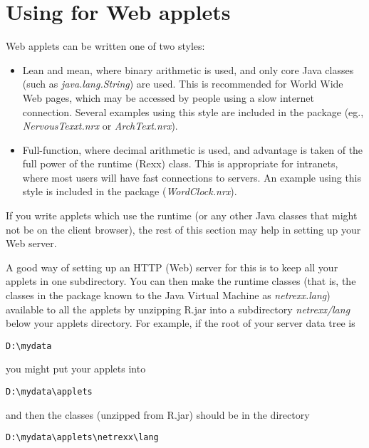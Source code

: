 \chapter{Using \nr{} for Web applets}

Web applets can be written one of two styles:
\begin{itemize}
\item Lean and mean, where binary arithmetic is used, and only core
Java classes (such as \emph{java.lang.String}) are used.  This is
recommended for World Wide Web pages, which may be accessed by people
using a slow internet connection.
Several examples using this style are included in the \nr{} package
(eg., \emph{NervousTexxt.nrx} or \emph{ArchText.nrx}).
\item Full-function, where decimal arithmetic is used, and advantage is
taken of the full power of the \nr{} runtime (Rexx) class.
This is appropriate for intranets, where most users will have fast
connections to servers.
An example using this style is included in the \nr{} package
(\emph{WordClock.nrx}).
\end{itemize}
If you write applets which use the \nr{} runtime (or any other Java
classes that might not be on the client browser), the rest of this
section may help in setting up your Web server.

A good way of setting up an HTTP (Web) server for this is to keep all
your applets in one subdirectory.  You can then make the \nr{} runtime
classes (that is, the classes in the package known to the Java Virtual
Machine as \emph{netrexx.lang}) available to all the applets by
unzipping \nr{}R.jar into a subdirectory \emph{netrexx/lang} below
your applets directory.
\newline
For example, if the root of your server data tree is
\begin{verbatim}
D:\mydata
\end{verbatim}
 you might put your applets into
\begin{verbatim}
D:\mydata\applets
\end{verbatim}
and then the \nr{} classes (unzipped from \nr{}R.jar) should be in
the directory
\begin{verbatim}
D:\mydata\applets\netrexx\lang
\end{verbatim}

